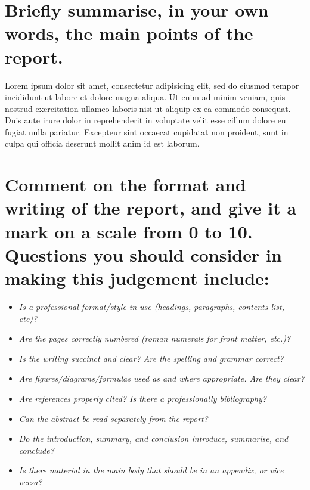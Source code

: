 \documentclass[10pt,a4paper]{article}
\begin{document}

\section{Briefly summarise, in your own words, the main points of the report.}

\begin{framed}
Lorem ipsum dolor sit amet, consectetur adipisicing elit, sed do eiusmod
tempor incididunt ut labore et dolore magna aliqua. Ut enim ad minim veniam,
quis nostrud exercitation ullamco laboris nisi ut aliquip ex ea commodo
consequat. Duis aute irure dolor in reprehenderit in voluptate velit esse
cillum dolore eu fugiat nulla pariatur. Excepteur sint occaecat cupidatat non
proident, sunt in culpa qui officia deserunt mollit anim id est laborum.
\end{framed}


\section{Comment on the format and writing of the report, and give it a mark on a scale from 0 to 10.  Questions you should consider in making this judgement include:}

\begin{itemize}\addtolength{\itemsep}{-0.5\baselineskip}
	\item \emph{Is a professional format/style in use (headings, paragraphs, contents list, etc)?}
	\item \emph{Are the pages correctly numbered (roman numerals for front matter, etc.)?}
	\item \emph{Is the writing succinct and clear?  Are the spelling and grammar correct?}
	\item \emph{Are figures/diagrams/formulas used as and where appropriate.  Are they clear?}
	\item \emph{Are references properly cited?  Is there a professionally bibliography?}
	\item \emph{Can the abstract be read separately from the report?}
	\item \emph{Do the introduction, summary, and conclusion introduce, summarise, and conclude?}
	\item \emph{Is there material in the main body that should be in an appendix, or vice versa?}
\end{itemize}
\end{document}
